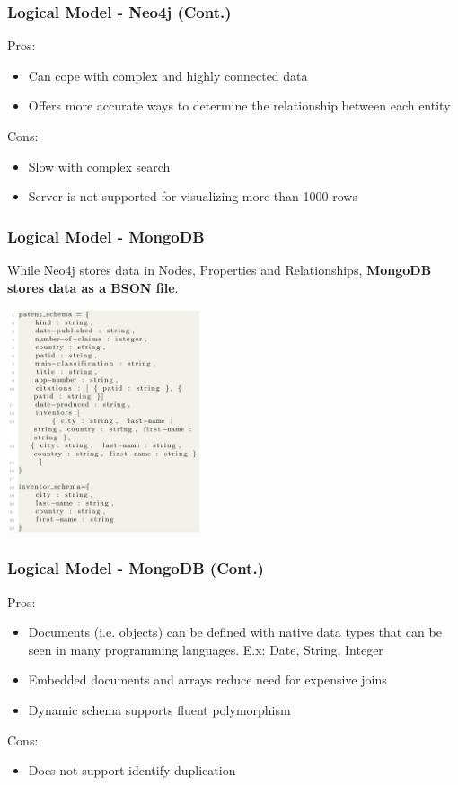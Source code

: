 \documentclass{beamer}
\begin{document}
\begin{frame}
\frametitle{Logical Model - Neo4j (Cont.)}
Pros:
\begin{itemize}
\item Can cope with complex and highly connected data
\item Offers more accurate ways to determine the relationship between each entity
\end{itemize}
Cons:
\begin{itemize}
\item Slow with complex search
\item Server is not supported for visualizing more than 1000 rows
\end{itemize}
\end{frame}

\begin{frame}
\frametitle{Logical Model - MongoDB}
While Neo4j stores data in Nodes, Properties and Relationships, \textbf{MongoDB stores data as a BSON file}.
\begin{center}
\includegraphics[height=2.6in]{mongodb.png}
\end{center}
\end{frame}

\begin{frame}
\frametitle{Logical Model - MongoDB (Cont.)}
Pros:
\begin{itemize}
\item Documents (i.e. objects) can be defined with native data types that can be seen in many programming languages. E.x: Date, String, Integer
\item Embedded documents and arrays reduce need for expensive joins
\item Dynamic schema supports fluent polymorphism
\end{itemize}
Cons:
\begin{itemize}
\item Does not support identify duplication
\end{itemize}
\end{frame}
\end{document}
